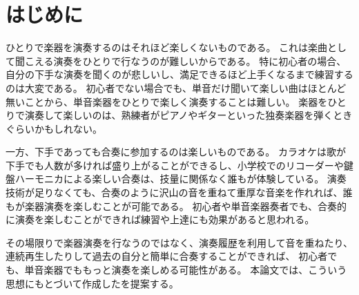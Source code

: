\section{はじめに}
\label{sec:start}

ひとりで楽器を演奏するのはそれほど楽しくないものである。
これは楽曲として聞こえる演奏をひとりで行なうのが難しいからである。
特に初心者の場合、 自分の下手な演奏を聞くのが悲しいし、満足できるほど上手くなるまで練習するのは大変である。
初心者でない場合でも、単音だけ聞いて楽しい曲はほとんど無いことから、単音楽器をひとりで楽しく演奏することは難しい。
楽器をひとりで演奏して楽しいのは、熟練者がピアノやギターといった独奏楽器を弾くときぐらいかもしれない。

一方、下手であっても合奏に参加するのは楽しいものである。
カラオケは歌が下手でも人数が多ければ盛り上がることができるし、小学校でのリコーダーや鍵盤ハーモニカによる楽しい合奏は、技量に関係なく誰もが体験している。
演奏技術が足りなくても、合奏のように沢山の音を重ねて重厚な音楽を作れれば、誰もが楽器演奏を楽しむことが可能である。
初心者や単音楽器奏者でも、合奏的に演奏を楽しむことができれば練習や上達にも効果があると思われる。

その場限りで楽器演奏を行なうのではなく、演奏履歴を利用して音を重ねたり、連続再生したりして過去の自分と簡単に合奏することができれば、
初心者でも、単音楽器でももっと演奏を楽しめる可能性がある。
本論文では、こういう思想にもとづいて作成した{\system}を提案する。

